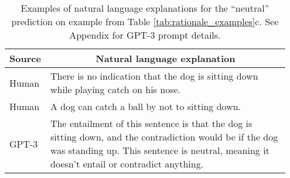 \begin{table*}[]
\centering
\small
\begin{tabular}{@{}p{0.1\linewidth} p{0.85\linewidth}@{}}
\toprule
\textbf{Source} & \multicolumn{1}{c}{\textbf{Natural language explanation}}                                                                                                                                               \\ \midrule
Human                               & There is no indication that the dog is sitting down while playing catch on his nose.                                                                                                                    \\
Human                               & A dog can catch a ball by not to sitting down.                                                                                                                                                          \\
GPT-3                    & The entailment of this sentence is that the dog is sitting down, and the contradiction would be if the dog was standing up. This sentence is neutral, meaning it doesn't entail or contradict anything. \\ \bottomrule
\end{tabular}
\caption{Examples of natural language explanations for the ``neutral'' prediction on \esnli example from Table \ref{tab:rationale_examples}c. See Appendix  for GPT-3 prompt details.}
\label{tab:nle_rationale_examples}
\end{table*}